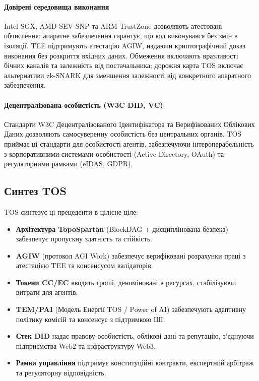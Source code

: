 \documentclass[11pt]{article}
\begin{document}
\paragraph{Довірені середовища виконання} Intel SGX, AMD SEV-SNP та ARM TrustZone дозволяють атестовані обчислення: апаратне забезпечення гарантує, що код виконувався без змін в ізоляції. TEE підтримують атестацію AGIW, надаючи криптографічний доказ виконання без розкриття вхідних даних. Обмеження включають вразливості бічних каналів та залежність від постачальника; дорожня карта TOS включає альтернативи zk-SNARK для зменшення залежності від конкретного апаратного забезпечення.

\paragraph{Децентралізована особистість (W3C DID, VC)} Стандарти W3C Децентралізованого Ідентифікатора та Верифікованих Облікових Даних дозволяють самосуверенну особистість без центральних органів. TOS приймає ці стандарти для особистості агентів, забезпечуючи інтероперабельність з корпоративними системами особистості (Active Directory, OAuth) та регуляторними рамками (eIDAS, GDPR).

\subsection{Синтез TOS}
TOS синтезує ці прецеденти в цілісне ціле:
\begin{itemize}[noitemsep]
  \item \textbf{Архітектура TopoSpartan} (BlockDAG + дисциплінована безпека) забезпечує пропускну здатність та стійкість.
  \item \textbf{AGIW} (протокол AGI Work) забезпечує верифіковані розрахунки праці з атестацією TEE та консенсусом валідаторів.
  \item \textbf{Токени CC/EC} вводять гроші, деноміновані в ресурсах, стабілізуючи витрати для агентів.
  \item \textbf{TEM/PAI} (Модель Енергії TOS / Power of AI) забезпечують адаптивну політику комісій та консенсус з підтримкою ШІ.
  \item \textbf{Стек DID} надає правову особистість, облікові дані та репутацію, з'єднуючи підприємства Web2 та інфраструктуру Web3.
  \item \textbf{Рамка управління} підтримує конституційні контракти, експертний арбітраж та регуляторну відповідність.
\end{itemize}
\end{document}
